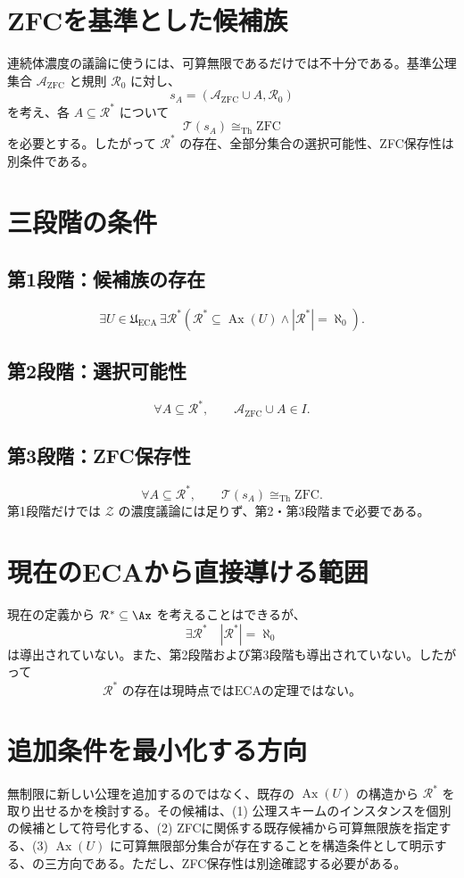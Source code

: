 \documentclass[11pt,a4paper]{article}
\begin{document}
\section{ZFCを基準とした候補族}
連続体濃度の議論に使うには、可算無限であるだけでは不十分である。基準公理集合 $\mathcal{A}_{\mathrm{ZFC}}$ と規則 $\mathcal{R}_0$ に対し、
\[
s_A=(\mathcal{A}_{\mathrm{ZFC}}\cup A,\mathcal{R}_0)
\]
を考え、各 $A\subseteq\mathcal{R}^*$ について
\[
\mathcal{T}(s_A)\cong_{\mathrm{Th}}\mathrm{ZFC}
\]
を必要とする。したがって $\mathcal{R}^*$ の存在、全部分集合の選択可能性、ZFC保存性は別条件である。

\section{三段階の条件}
\subsection*{第1段階：候補族の存在}
\[
\exists U\in\mathfrak U_{\mathrm{ECA}}\,\exists\mathcal{R}^*
\left(\mathcal{R}^*\subseteq\operatorname{Ax}(U)\land|\mathcal{R}^*|=\aleph_0\right).
\]
\subsection*{第2段階：選択可能性}
\[
\forall A\subseteq\mathcal{R}^*,\qquad \mathcal{A}_{\mathrm{ZFC}}\cup A\in I.
\]
\subsection*{第3段階：ZFC保存性}
\[
\forall A\subseteq\mathcal{R}^*,\qquad \mathcal{T}(s_A)\cong_{\mathrm{Th}}\mathrm{ZFC}.
\]
第1段階だけでは $\mathcal{Z}$ の濃度議論には足りず、第2・第3段階まで必要である。

\section{現在のECAから直接導ける範囲}
現在の定義から $\mathcal{R}^*\subseteq\Ax$ を考えることはできるが、
\[
\exists\mathcal{R}^*\quad |\mathcal{R}^*|=\aleph_0
\]
は導出されていない。また、第2段階および第3段階も導出されていない。したがって
\[
\boxed{\mathcal{R}^*\text{ の存在は現時点ではECAの定理ではない。}}
\]

\section{追加条件を最小化する方向}
無制限に新しい公理を追加するのではなく、既存の $\operatorname{Ax}(U)$ の構造から $\mathcal{R}^*$ を取り出せるかを検討する。その候補は、(1) 公理スキームのインスタンスを個別の候補として符号化する、(2) ZFCに関係する既存候補から可算無限族を指定する、(3) $\operatorname{Ax}(U)$ に可算無限部分集合が存在することを構造条件として明示する、の三方向である。ただし、ZFC保存性は別途確認する必要がある。
\end{document}

